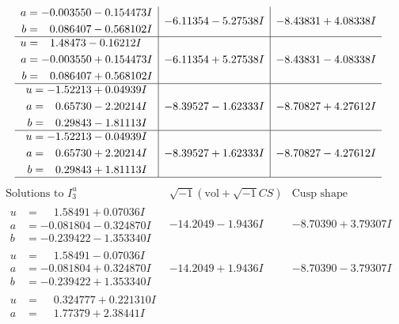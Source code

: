 \documentclass[1p]{elsarticle_modified}
\theoremstyle{definition}
\newcommand{\I}{\sqrt{-1}}
\begin{document}
$$\begin{array}{c|c|c}
\begin{aligned}
a &= -0.003550 - 0.154473 I \\
b &= \phantom{-}0.086407 - 0.568102 I\end{aligned}
 & -6.11354 - 5.27538 I & -8.43831 + 4.08338 I \\ \hline\begin{aligned}
u &= \phantom{-}1.48473 - 0.16212 I \\
a &= -0.003550 + 0.154473 I \\
b &= \phantom{-}0.086407 + 0.568102 I\end{aligned}
 & -6.11354 + 5.27538 I & -8.43831 - 4.08338 I \\ \hline\begin{aligned}
u &= -1.52213 + 0.04939 I \\
a &= \phantom{-}0.65730 - 2.20214 I \\
b &= \phantom{-}0.29843 - 1.81113 I\end{aligned}
 & -8.39527 - 1.62333 I & -8.70827 + 4.27612 I \\ \hline\begin{aligned}
u &= -1.52213 - 0.04939 I \\
a &= \phantom{-}0.65730 + 2.20214 I \\
b &= \phantom{-}0.29843 + 1.81113 I\end{aligned}
 & -8.39527 + 1.62333 I & -8.70827 - 4.27612 I\\
 \hline 
 \end{array}$$\newpage$$\begin{array}{c|c|c}  
\text{Solutions to }I^u_{3}& \I (\text{vol} + \sqrt{-1}CS) & \text{Cusp shape}\\
 \hline 
\begin{aligned}
u &= \phantom{-}1.58491 + 0.07036 I \\
a &= -0.081804 - 0.324870 I \\
b &= -0.239422 - 1.353340 I\end{aligned}
 & -14.2049 - 1.9436 I & -8.70390 + 3.79307 I \\ \hline\begin{aligned}
u &= \phantom{-}1.58491 - 0.07036 I \\
a &= -0.081804 + 0.324870 I \\
b &= -0.239422 + 1.353340 I\end{aligned}
 & -14.2049 + 1.9436 I & -8.70390 - 3.79307 I \\ \hline\begin{aligned}
u &= \phantom{-}0.324777 + 0.221310 I \\
a &= \phantom{-}1.77379 + 2.38441 I \\

\end{aligned}
\end{array}$$
\end{document}
